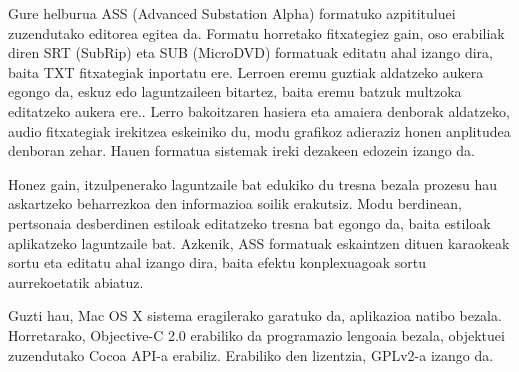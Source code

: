 
\thispagestyle{empty}

Gure helburua ASS (Advanced Substation Alpha) formatuko azpitituluei zuzendutako editorea egitea da. Formatu horretako fitxategiez gain, oso erabiliak diren SRT (SubRip) eta SUB (MicroDVD) formatuak editatu ahal izango dira, baita TXT fitxategiak inportatu ere. Lerroen eremu guztiak aldatzeko aukera egongo da, eskuz edo laguntzaileen bitartez, baita eremu batzuk multzoka editatzeko aukera ere.. Lerro bakoitzaren hasiera eta amaiera denborak aldatzeko, audio fitxategiak irekitzea eskeiniko du, modu grafikoz adieraziz honen anplitudea denboran zehar. Hauen formatua sistemak ireki dezakeen edozein izango da.

Honez gain, itzulpenerako laguntzaile bat edukiko du tresna bezala prozesu hau askartzeko beharrezkoa den informazioa soilik erakutsiz. Modu berdinean, pertsonaia desberdinen estiloak editatzeko tresna bat egongo da, baita estiloak aplikatzeko laguntzaile bat. Azkenik, ASS formatuak eskaintzen dituen karaokeak sortu eta editatu ahal izango dira, baita efektu konplexuagoak sortu aurrekoetatik abiatuz.

Guzti hau, Mac OS X sistema eragilerako garatuko da, aplikazioa natibo bezala. Horretarako, Objective-C 2.0 erabiliko da programazio lengoaia bezala, objektuei zuzendutako Cocoa API-a erabiliz. Erabiliko den lizentzia, GPLv2-a izango da.

\clearpage                         %
\thispagestyle{empty} \ \clearpage %
